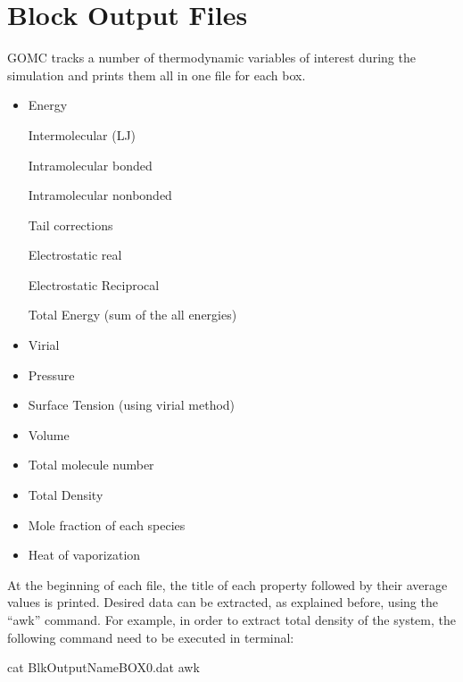 \documentclass[letterpaper,10pt,english]{sphinxmanual}
\begin{document}
\section{Block Output Files}
\label{\detokenize{output_file:block-output-files}}
GOMC tracks a number of thermodynamic variables of interest during the simulation and prints them all in one file for each box.
\begin{itemize}
\item {} 
Energy

\textendash{} Intermolecular (LJ)

\textendash{} Intramolecular bonded

\textendash{} Intramolecular nonbonded

\textendash{} Tail corrections

\textendash{} Electrostatic real

\textendash{} Electrostatic Reciprocal

\textendash{} Total Energy (sum of the all energies)

\item {} 
Virial

\item {} 
Pressure

\item {} 
Surface Tension (using virial method)

\item {} 
Volume

\item {} 
Total molecule number

\item {} 
Total Density

\item {} 
Mole fraction of each species

\item {} 
Heat of vaporization

\end{itemize}

At the beginning of each file, the title of each property followed by their average values is printed. Desired data can be extracted, as explained before, using the “awk” command. For example, in order to extract total density of the system, the following command need to be executed in terminal:

%
\begin{sphinxVerbatim}[commandchars=\\\{\}]
\PYGZdl{} cat Blk\PYGZus{}OutputName\PYGZus{}BOX\PYGZus{}0.dat  awk 
\end{sphinxVerbatim}
\end{document}
